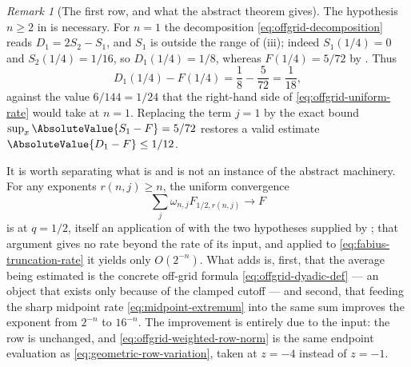 \documentclass[11pt,a4paper,oneside,openany]{book}
\theoremstyle{definition}
\theoremstyle{remark}
\newtheorem{remark}[remark]{Remark}
\begin{document}
\begin{remark}[The first row, and what the abstract theorem gives]\label{rem:offgrid-first-row}
The hypothesis $n\ge2$ in  is necessary.  For
$n=1$ the decomposition \eqref{eq:offgrid-decomposition} reads
$D_1=2S_2-S_1$, and $S_1$ is outside the range of
(iii); indeed $S_1(1/4)=0$ and $S_2(1/4)=1/16$,
so $D_1(1/4)=1/8$, whereas $F(1/4)=5/72$ by
.  Thus
\[
 D_1(1/4)-F(1/4)=\frac18-\frac5{72}=\frac1{18},
\]
against the value $6/144=1/24$ that the right-hand side of
\eqref{eq:offgrid-uniform-rate} would take at $n=1$.  Replacing the term $j=1$
by the exact bound $\sup_x\AbsoluteValue{S_1-F}=5/72$ restores a valid estimate
$\AbsoluteValue{D_1-F}\le1/12$.

It is worth separating what is and is not an instance of the abstract machinery.
For any exponents $r(n,j)\ge n$, the uniform convergence
\[
 \sum_j\omega_{n,j}F_{1/2,r(n,j)}\longrightarrow F
\]
is  at $q=1/2$, itself an
application of  with the two hypotheses supplied by
; that argument gives no rate beyond the rate
of its input, and applied to \eqref{eq:fabius-truncation-rate} it yields only
$O(2^{-n})$.  What  adds is, first, that the
average being estimated is the concrete off-grid formula
\eqref{eq:offgrid-dyadic-def} --- an object that exists only because of the
clamped cutoff --- and second, that feeding the sharp midpoint rate
\eqref{eq:midpoint-extremum} into the same sum improves the exponent from
$2^{-n}$ to $16^{-n}$.  The improvement is entirely due to the input: the row
is unchanged, and \eqref{eq:offgrid-weighted-row-norm} is the same endpoint
evaluation as \eqref{eq:geometric-row-variation}, taken at $z=-4$ instead of
$z=-1$.
\end{remark}
\end{document}
